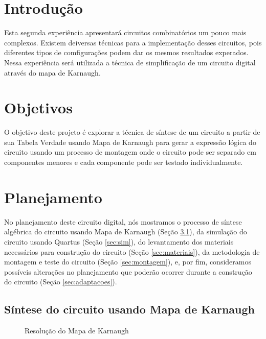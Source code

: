 \documentclass[a4,12pt]{horizon-theme}
\begin{document}
\horizonCover

\horizonTitle

\section{Introdução}

Esta segunda experiência apresentará circuitos combinatórios um pouco mais complexos. Existem deiversas técnicas para a implementação desses circuitos, pois diferentes tipos de comfigurações podem dar os mesmos resultados experados. Nessa experiência será utilizada a técnica de simplificação de um circuito digital através do mapa de Karnaugh.

\section{Objetivos}
O objetivo deste projeto é explorar a técnica de síntese de um circuito a partir de sua Tabela Verdade usando Mapa de Karnaugh para gerar a expressão lógica do circuito usando um processo de montagem onde o circuito pode ser separado em componentes menores e cada componente pode ser testado individualmente.


\section{Planejamento}
No planejamento deste circuito digital, nós mostramos o processo de síntese algébrica do circuito usando Mapa de Karnaugh (Seção \ref{sec:karnaugh}), da simulação do circuito usando Quartus (Seção \ref{sec:sim}), do levantamento dos materiais necessários para construção do circuito (Seção \ref{sec:materiais}), da metodologia de montagem e teste do circuito (Seção \ref{sec:montagem}), e, por fim, consideramos possíveis alterações no planejamento que poderão ocorrer durante a construção do circuito (Seção \ref{sec:adaptacoes}).

\subsection{Síntese do circuito usando Mapa de Karnaugh}
\label{sec:karnaugh}

\begin{figure}[!ht]
\centering
{}
\caption{Resolução do Mapa de Karnaugh}
\label{fig:mapa}
\end{figure}
\end{document}
